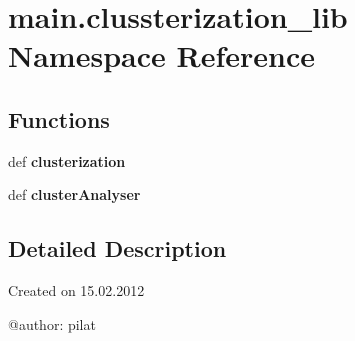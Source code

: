 \hypertarget{namespacemain_1_1clussterization__lib}{\section{main.\-clussterization\-\_\-lib Namespace Reference}
\label{namespacemain_1_1clussterization__lib}
}
\subsection*{Functions}
\begin{DoxyCompactItemize}
\item 
\hypertarget{namespacemain_1_1clussterization__lib_a4a95175d2aafc131b4d2928c89a7980b}{def {\bfseries clusterization}}\label{namespacemain_1_1clussterization__lib_a4a95175d2aafc131b4d2928c89a7980b}

\item 
\hypertarget{namespacemain_1_1clussterization__lib_ab807ccdd42c3dd34d7b2261a5f0c2502}{def {\bfseries cluster\-Analyser}}\label{namespacemain_1_1clussterization__lib_ab807ccdd42c3dd34d7b2261a5f0c2502}

\end{DoxyCompactItemize}


\subsection{Detailed Description}
\begin{DoxyVerb}Created on 15.02.2012

@author: pilat
\end{DoxyVerb}
 
